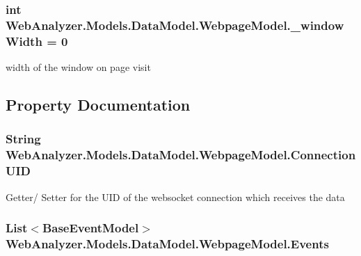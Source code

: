 \subsubsection[{\+\_\+window\+Width}]{\setlength{\rightskip}{0pt plus 5cm}int Web\+Analyzer.\+Models.\+Data\+Model.\+Webpage\+Model.\+\_\+window\+Width = 0\hspace{0.3cm}{\ttfamily [private]}}\label{class_web_analyzer_1_1_models_1_1_data_model_1_1_webpage_model_ae9604da5bff18321d117bae9c29d19b1}


width of the window on page visit 



\subsection{Property Documentation}
\hypertarget{class_web_analyzer_1_1_models_1_1_data_model_1_1_webpage_model_a5f1bed3947c7e7b6a5fe34fdd23f3841}{}
\subsubsection[{Connection\+U\+I\+D}]{\setlength{\rightskip}{0pt plus 5cm}String Web\+Analyzer.\+Models.\+Data\+Model.\+Webpage\+Model.\+Connection\+U\+I\+D\hspace{0.3cm}{\ttfamily [get]}}\label{class_web_analyzer_1_1_models_1_1_data_model_1_1_webpage_model_a5f1bed3947c7e7b6a5fe34fdd23f3841}


Getter/ Setter for the U\+I\+D of the websocket connection which receives the data 

\hypertarget{class_web_analyzer_1_1_models_1_1_data_model_1_1_webpage_model_aa80b98da4b9e9c2d6b6950f4e52c0b61}{}
\subsubsection[{Events}]{\setlength{\rightskip}{0pt plus 5cm}List$<${\bf Base\+Event\+Model}$>$ Web\+Analyzer.\+Models.\+Data\+Model.\+Webpage\+Model.\+Events\hspace{0.3cm}{\ttfamily [get]}}\label{class_web_analyzer_1_1_models_1_1_data_model_1_1_webpage_model_aa80b98da4b9e9c2d6b6950f4e52c0b61}


